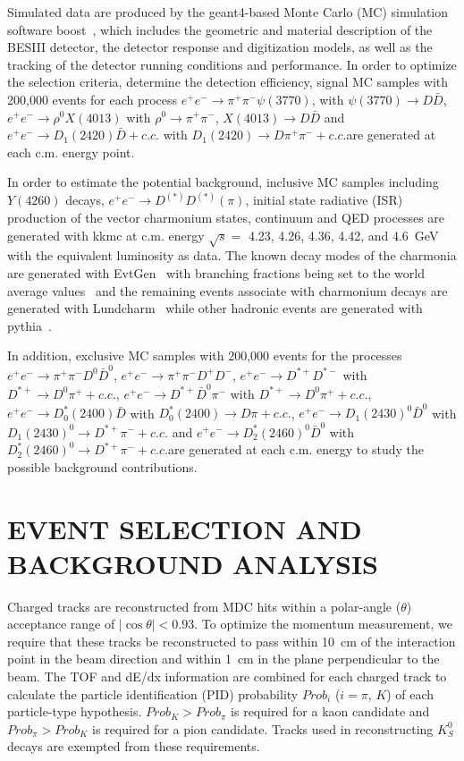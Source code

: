 \documentclass[aps,preprint,superscriptaddress,12pt,tightenlines]{revtex4}
\begin{document}
Simulated data are produced by the {\sc geant4}-based Monte Carlo
(MC) simulation software {\sc boost}~\cite{boost}, which includes
the geometric and material description of the BESIII detector, the
detector response and digitization models, as well as the tracking
of the detector running conditions and performance. In order to
optimize the selection criteria, determine the detection
efficiency, signal MC samples with 200,000 events for each process
$e^{+}e^{-}\to \pi^{+}\pi^{-}\psi(3770)$, with $\psi(3770) \to
D\bar{D}$, $e^{+}e^{-}\to \rho^{0}X(4013)$ with
$\rho^{0} \to \pi^{+}\pi^{-}$, $X(4013)\to D\bar{D}$ and $e^{+}e^{-}\to D_{1}(2420)\bar{D}+c.c.$ with $D_{1}(2420)\to
D\pi^{+}\pi^{-}+c.c.$are generated
at each c.m. energy point.

In order to estimate the potential background, inclusive MC
samples including $Y(4260)$ decays, $e^{+}e^{-}\to
D^{(*)}D^{(*)}(\pi)$, initial state radiative (ISR) production of
the vector charmonium states, continuum and QED processes are
generated with {\sc kkmc} at c.m. energy $\sqrt{s}=$ 4.23, 4.26,
4.36, 4.42, and 4.6~GeV with the equivalent luminosity as data.
The known decay modes of the charmonia are generated with {\sc
EvtGen}~\cite{EvtGen} with branching fractions being set to the
world average values~\cite{PDG} and the remaining events associate
with charmonium decays are generated with {\sc
Lundcharm}~\cite{Lundcharm} while other hadronic events are
generated with {\sc pythia}~\cite{PYTHIA}.

In addition, exclusive MC samples with 200,000 events for the
processes $e^{+}e^{-}\to\pi^{+}\pi^{-}D^{0}\bar{D}^{0}$, $e^{+}e^{-}\to\pi^{+}\pi^{-}D^{+}D^{-}$, $e^{+}e^{-}\to D^{*+}D^{*-}$ with $D^{*+}\to
D^{0}\pi^{+}+c.c.$, $e^{+}e^{-}\to D^{*+}\bar{D}^{0}\pi^{-}$ with
$D^{*+}\to D^{0}\pi^{+}+c.c.$, $e^{+}e^{-}\to
D^{*}_{0}(2400)\bar{D}$ with $D^{*}_{0}(2400)\to D\pi+c.c.$,
$e^{+}e^{-}\to D_{1}(2430)^{0}\bar{D}^{0}$ with $D_{1}(2430)^{0}\to
D^{*+}\pi^{-}+c.c.$ and $e^{+}e^{-}\to D^{*}_{2}(2460)^{0}\bar{D}^{0}$ with
$D^{*}_{2}(2460)^{0}\to D^{*+}\pi^{-}+c.c.$are
generated at each c.m. energy to study the possible background
contributions.

\section{EVENT SELECTION AND BACKGROUND ANALYSIS}

Charged tracks are reconstructed from MDC hits within a
polar-angle ($\theta$) acceptance range of $|\cos\theta| <0.93$.
To optimize the momentum measurement, we require that these tracks
be reconstructed to pass within 10~cm of the interaction point in
the beam direction and within 1~cm in the plane perpendicular to
the beam. The TOF and dE/dx information are combined for each
charged track to calculate the particle identification (PID)
probability $Prob_{i}$ ($i=\pi$, $K$) of each particle-type
hypothesis. $Prob_K>Prob_\pi$ is required for a kaon candidate and
$Prob_\pi>Prob_K$ is required for a pion candidate. Tracks used in
reconstructing $K^{0}_{S}$ decays are exempted from these
requirements.
\end{document}
